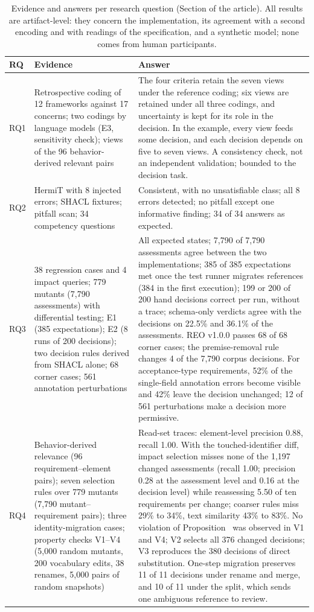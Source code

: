 \documentclass[10pt]{article}
\newcommand{\REO}{REO}
\begin{document}
\begin{table}[H]
\caption{Evidence and answers per research question (Section \ArtSecEvaluation{} of the article). All results are artifact-level: they concern the implementation, its agreement with a second encoding and with readings of the specification, and a synthetic model; none comes from human participants.}
\small
\begin{tabular}{@{}L{0.9cm}L{5.2cm}L{10.2cm}@{}}
\toprule
\textbf{RQ} & \textbf{Evidence} & \textbf{Answer} \\
\midrule
RQ1 & Retrospective coding of 12 frameworks against 17 concerns; two codings by language models (E3, sensitivity check); views of the 96 behavior-derived relevant pairs & The four criteria retain the seven views under the reference coding; six views are retained under all three codings, and uncertainty is kept for its role in the decision. In the example, every view feeds some decision, and each decision depends on five to seven views. A consistency check, not an independent validation; bounded to the decision task. \\
RQ2 & HermiT with 8 injected errors; SHACL fixtures; pitfall scan; 34 competency questions & Consistent, with no unsatisfiable class; all 8 errors detected; no pitfall except one informative finding; 34 of 34 answers as expected. \\
RQ3 & 38 regression cases and 4 impact queries; 779 mutants (7,790 assessments) with differential testing; E1 (385 expectations); E2 (8 runs of 200 decisions); two decision rules derived from SHACL alone; 68 corner cases; 561 annotation perturbations & All expected states; 7,790 of 7,790 assessments agree between the two implementations; 385 of 385 expectations met once the test runner migrates references (384 in the first execution); 199 or 200 of 200 hand decisions correct per run, without a trace; schema-only verdicts agree with the decisions on 22.5\% and 36.1\% of the assessments. \REO{} v1.0.0 passes 68 of 68 corner cases; the premise-removal rule changes 4 of the 7,790 corpus decisions. For acceptance-type requirements, 52\% of the single-field annotation errors become visible and 42\% leave the decision unchanged; 12 of 561 perturbations make a decision more permissive. \\
RQ4 & Behavior-derived relevance (96 requirement--element pairs); seven selection rules over 779 mutants (7,790 mutant--requirement pairs); three identity-migration cases; property checks V1--V4 (5,000 random mutants, 200 vocabulary edits, 38 renames, 5,000 pairs of random snapshots) & Read-set traces: element-level precision 0.88, recall 1.00. With the touched-identifier diff, impact selection misses none of the 1,197 changed assessments (recall 1.00; precision 0.28 at the assessment level and 0.16 at the decision level) while reassessing 5.50 of ten requirements per change; coarser rules miss 29\% to 34\%, text similarity 43\% to 83\%. No violation of Proposition~\ArtPropSufficiency{} was observed in V1 and V4; V2 selects all 376 changed decisions; V3 reproduces the 380 decisions of direct substitution. One-step migration preserves 11 of 11 decisions under rename and merge, and 10 of 11 under the split, which sends one ambiguous reference to review. \\

\end{tabular}
\end{table}
\end{document}
